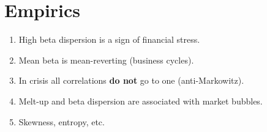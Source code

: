 \documentclass[leqno,12pt]{article}
\begin{document}
{\newpage


\section{Empirics}


\begin{enumerate}
  \item High beta dispersion is a sign of financial stress.
  \item Mean beta is mean-reverting (business cycles).
  \item In crisis all correlations {\bf do not} go to one
  (anti-Markowitz).
  \item Melt-up and beta dispersion are associated with
   market bubbles.
  \item Skewness, entropy, etc.
\end{enumerate}


}
\end{document}
